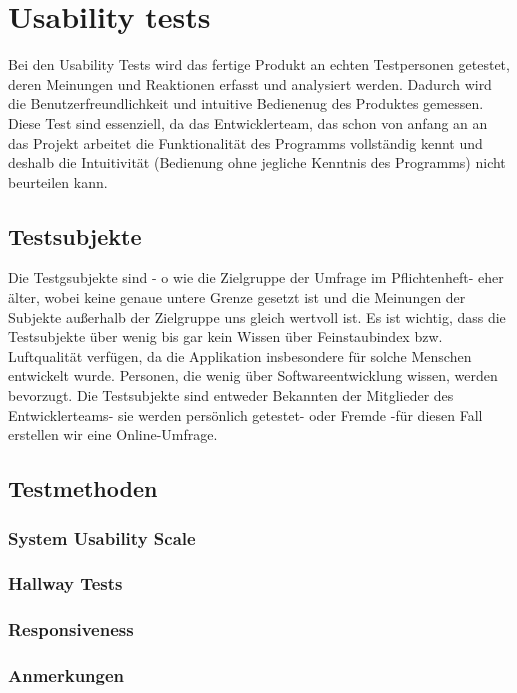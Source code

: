 \section{Usability tests}

Bei den Usability Tests wird das fertige Produkt an echten Testpersonen getestet, deren  Meinungen und Reaktionen erfasst und analysiert werden. Dadurch wird die Benutzerfreundlichkeit und intuitive Bedienenug des Produktes gemessen. Diese Test sind essenziell, da das Entwicklerteam, das schon von anfang an an das Projekt arbeitet die Funktionalität des Programms vollständig kennt und deshalb die Intuitivität (Bedienung ohne jegliche Kenntnis des Programms) nicht beurteilen kann.

\subsection{Testsubjekte}

Die Testgsubjekte sind - o wie die Zielgruppe der Umfrage im Pflichtenheft- eher älter, wobei keine genaue untere Grenze gesetzt ist und die Meinungen der Subjekte außerhalb der Zielgruppe uns gleich wertvoll ist. Es ist wichtig, dass die Testsubjekte über wenig bis gar kein Wissen über Feinstaubindex bzw. Luftqualität verfügen, da die Applikation insbesondere für solche Menschen entwickelt wurde. Personen, die wenig über Softwareentwicklung wissen, werden bevorzugt. Die Testsubjekte sind entweder Bekannten der Mitglieder des Entwicklerteams- sie werden persönlich getestet- oder Fremde -für diesen Fall erstellen wir eine Online-Umfrage. 

\subsection{Testmethoden} 
\subsubsection{System Usability Scale}
\subsubsection{Hallway Tests}
\subsubsection{Responsiveness}
\subsubsection{Anmerkungen}

